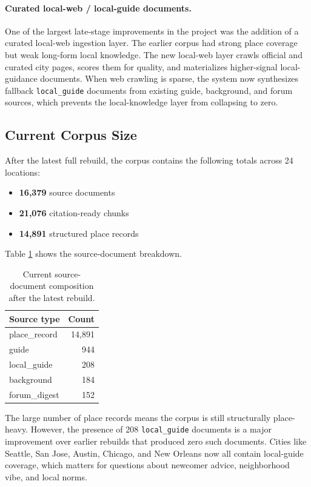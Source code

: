\documentclass[11pt]{article}
\begin{document}
\paragraph{Curated local-web / local-guide documents.}
One of the largest late-stage improvements in the project was the addition of a curated local-web ingestion layer. The earlier corpus had strong place coverage but weak long-form local knowledge. The new local-web layer crawls official and curated city pages, scores them for quality, and materializes higher-signal local-guidance documents. When web crawling is sparse, the system now synthesizes fallback \texttt{local\_guide} documents from existing guide, background, and forum sources, which prevents the local-knowledge layer from collapsing to zero.

\subsection{Current Corpus Size}
After the latest full rebuild, the corpus contains the following totals across 24 locations:
\begin{itemize}[leftmargin=*]
    \item \textbf{16,379} source documents
    \item \textbf{21,076} citation-ready chunks
    \item \textbf{14,891} structured place records
\end{itemize}

Table \ref{tab:source-breakdown} shows the source-document breakdown.

\begin{table}[H]
\centering
\caption{Current source-document composition after the latest rebuild.}
\label{tab:source-breakdown}
\begin{tabular}{lr}
\toprule
Source type & Count \\
\midrule
place\_record & 14,891 \\
guide & 944 \\
local\_guide & 208 \\
background & 184 \\
forum\_digest & 152 \\
\bottomrule
\end{tabular}
\end{table}

The large number of place records means the corpus is still structurally place-heavy. However, the presence of 208 \texttt{local\_guide} documents is a major improvement over earlier rebuilds that produced zero such documents. Cities like Seattle, San Jose, Austin, Chicago, and New Orleans now all contain local-guide coverage, which matters for questions about newcomer advice, neighborhood vibe, and local norms.
\end{document}
